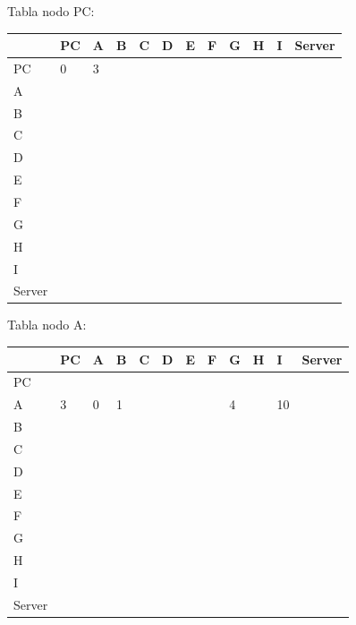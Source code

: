 \documentclass[a4paper]{article}
\begin{document}
\begin{table}[ht]
Tabla nodo PC:\\
\begin{tabular}{|l|l|l|l|l|l|l|l|l|l|l|l|}
\hline
       & PC & A & B & C & D & E & F & G & H & I & Server \\ \hline
PC     & 0  & 3 &   &   &   &   &   &   &   &   &        \\ \hline
A      &    &   &   &   &   &   &   &   &   &   &        \\ \hline
B      &    &   &   &   &   &   &   &   &   &   &        \\ \hline
C      &    &   &   &   &   &   &   &   &   &   &        \\ \hline
D      &    &   &   &   &   &   &   &   &   &   &        \\ \hline
E      &    &   &   &   &   &   &   &   &   &   &        \\ \hline
F      &    &   &   &   &   &   &   &   &   &   &        \\ \hline
G      &    &   &   &   &   &   &   &   &   &   &        \\ \hline
H      &    &   &   &   &   &   &   &   &   &   &        \\ \hline
I      &    &   &   &   &   &   &   &   &   &   &        \\ \hline
Server &    &   &   &   &   &   &   &   &   &   &        \\ \hline
\end{tabular}
\end{table}
\clearpage


\begin{table}[ht]
Tabla nodo A:\\
\begin{tabular}{|l|l|l|l|l|l|l|l|l|l|l|l|}
\hline
       & PC & A & B & C & D & E & F & G & H & I & Server \\ \hline
PC     &    &   &   &   &   &   &   &   &   &   &        \\ \hline
A      & 3  & 0 & 1 &   &   &   &   & 4 &   & 10&        \\ \hline
B      &    &   &   &   &   &   &   &   &   &   &        \\ \hline
C      &    &   &   &   &   &   &   &   &   &   &        \\ \hline
D      &    &   &   &   &   &   &   &   &   &   &        \\ \hline
E      &    &   &   &   &   &   &   &   &   &   &        \\ \hline
F      &    &   &   &   &   &   &   &   &   &   &        \\ \hline
G      &    &   &   &   &   &   &   &   &   &   &        \\ \hline
H      &    &   &   &   &   &   &   &   &   &   &        \\ \hline
I      &    &   &   &   &   &   &   &   &   &   &        \\ \hline
Server &    &   &   &   &   &   &   &   &   &   &        \\ \hline
\end{tabular}
\end{table}
\end{document}
